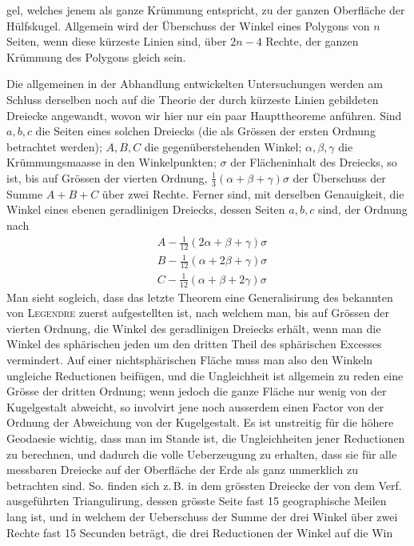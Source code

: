 %
gel, welches jenem als ganze Krümmung entspricht, zu der ganzen Oberfläche der Hülfskugel. Allgemein wird der Überschuss der Winkel eines Polygons von \(n\) Seiten, wenn diese kürzeste Linien sind, über \(2n-4\) Rechte, der ganzen Krümmung des Polygons gleich sein.

Die allgemeinen in der Abhandlung entwickelten Untersuchungen werden am Schluss derselben noch auf die Theorie der durch kürzeste Linien gebildeten Dreiecke angewandt, wovon wir hier nur ein paar Haupttheoreme anführen. Sind \(a,b,c\) die Seiten eines solchen Dreiecks (die als Grössen der ersten Ordnung betrachtet werden); \(A,B,C\) die gegenüberstehenden Winkel; \(\alpha,\beta,\gamma\) die Krümmungsmaasse in den Winkelpunkten; \(\sigma\) der Flächeninhalt des Dreiecks, so ist, bis auf Grössen der vierten Ordnung, \(\tfrac13(\alpha+\beta+\gamma)\sigma\) der Überschuss der Summe \(A+B+C\) über zwei Rechte. Ferner sind, mit derselben Genauigkeit, die Winkel eines ebenen geradlinigen Dreiecks, dessen Seiten \(a,b,c\) sind, der Ordnung nach
\[
\begin{aligned}
&A-\tfrac1{12}(2\alpha+\beta+\gamma)\sigma\\
&B-\tfrac1{12}(\alpha+2\beta+\gamma)\sigma\\
&C-\tfrac1{12}(\alpha+\beta+2\gamma)\sigma
\end{aligned}
\]
Man sieht sogleich, dass das letzte Theorem eine Generalisirung des bekannten von \textsc{Legendre} zuerst aufgestellten ist, nach welchem man, bis auf Grössen der vierten Ordnung, die Winkel des geradlinigen Dreiecks erhält, wenn man die Winkel des sphärischen jeden um den dritten Theil des sphärischen Excesses vermindert. Auf einer nichtsphärischen Fläche muss man also den Winkeln ungleiche Reductionen beifügen, und die Ungleichheit ist allgemein zu reden eine Grösse der dritten Ordnung; wenn jedoch die ganze Fläche nur wenig von der Kugelgestalt abweicht, so involvirt jene noch ausserdem einen Factor von der Ordnung der Abweichung von der Kugelgestalt. Es ist unstreitig für die höhere Geodaesie wichtig, dass man im Stande ist, die Ungleichheiten jener Reductionen zu berechnen, und dadurch die volle Ueberzeugung zu erhalten, dass sie für alle messbaren Dreiecke auf der Oberfläche der Erde als ganz unmerklich zu betrachten sind. So. finden sich z.\,B. in dem grössten Dreiecke der von dem Verf. ausgeführten Triangulirung, dessen grösste Seite fast 15 geographische Meilen lang ist, und in welchem der Ueberschuss der Summe der drei Winkel über zwei Rechte fast 15 Secunden beträgt, die drei Reductionen der Winkel auf die Win%

